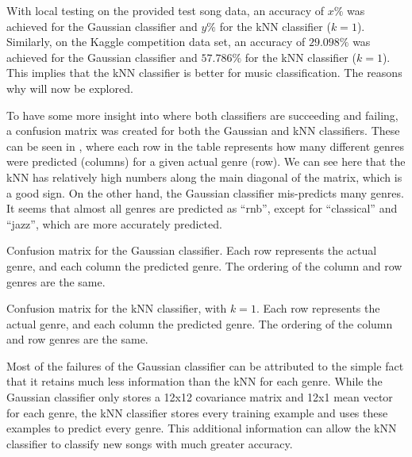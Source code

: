 \documentclass[a4paper,titlepage]{article}
\begin{document}
	With local testing on the provided test song data, an accuracy of $x\%$ was achieved for the Gaussian classifier and $y\%$ for the kNN classifier ($k = 1$). Similarly, on the Kaggle competition data set, an accuracy of $29.098\%$ was achieved for the Gaussian classifier and $57.786\%$ for the kNN classifier ($k = 1$). This implies that the kNN classifier is better for music classification. The reasons why will now be explored.
	
	To have some more insight into where both classifiers are succeeding and failing, a confusion matrix was created for both the Gaussian and kNN classifiers. These can be seen in , where each row in the table represents how many different genres were predicted (columns) for a given actual genre (row). We can see here that the kNN has relatively high numbers along the main diagonal of the matrix, which is a good sign. On the other hand, the Gaussian classifier mis-predicts many genres. It seems that almost all genres are predicted as ``rnb'', except for ``classical'' and ``jazz'', which are more accurately predicted.
	
	\begin{table}[!htb]
		\centering
		\caption{Confusion matrix for the Gaussian classifier. Each row represents the actual genre, and each column the predicted genre. The ordering of the column and row genres are the same.}
		\label{table:confusion_gaussian}
	\end{table}

	\begin{table}[!htb]
		\centering
		\caption{Confusion matrix for the kNN classifier, with $k = 1$. Each row represents the actual genre, and each column the predicted genre. The ordering of the column and row genres are the same.}
		\label{table:confusion_knn_1}
	\end{table}
	
	Most of the failures of the Gaussian classifier can be attributed to the simple fact that it retains much less information than the kNN for each genre. While the Gaussian classifier only stores a 12x12 covariance matrix and 12x1 mean vector for each genre, the kNN classifier stores every training example and uses these examples to predict every genre. This additional information can allow the kNN classifier to classify new songs with much greater accuracy.
		
\end{document}
